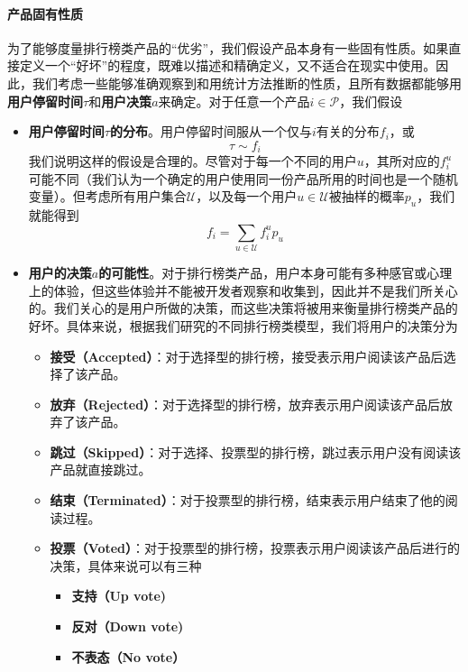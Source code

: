 \documentclass[UTF8]{ctexart}
\theoremstyle{plain}
\theoremstyle{definition}
\theoremstyle{remark}
\begin{document}
	\paragraph{产品固有性质} 为了能够度量排行榜类产品的“优劣”，我们假设产品本身有一些固有性质。如果直接定义一个“好坏”的程度，既难以描述和精确定义，又不适合在现实中使用。因此，我们考虑一些能够准确观察到和用统计方法推断的性质，且所有数据都能够用\textbf{用户停留时间}$\tau$和\textbf{用户决策}$a$来确定。对于任意一个产品$i \in \mathcal{P}$，我们假设
	\begin{itemize}
		\item \textbf{用户停留时间$\tau$的分布}。用户停留时间服从一个仅与$i$有关的分布$f_i$，或
		$$
		\tau \sim f_i
		$$
		我们说明这样的假设是合理的。尽管对于每一个不同的用户$u$，其所对应的$f_i^u$可能不同（我们认为一个确定的用户使用同一份产品所用的时间也是一个随机变量）。但考虑所有用户集合$\mathcal{U}$，以及每一个用户$u \in \mathcal{U}$被抽样的概率$p_u$，我们就能得到
		$$
		f_i = \sum_{u \in \mathcal{U}} f_i^u p_u 
		$$
		\item \textbf{用户的决策$a$的可能性}。对于排行榜类产品，用户本身可能有多种感官或心理上的体验，但这些体验并不能被开发者观察和收集到，因此并不是我们所关心的。我们关心的是用户所做的决策，而这些决策将被用来衡量排行榜类产品的好坏。具体来说，根据我们研究的不同排行榜类模型，我们将用户的决策分为
		\begin{itemize}
			\item \textbf{接受（Accepted）}：对于选择型的排行榜，接受表示用户阅读该产品后选择了该产品。
			\item \textbf{放弃（Rejected）}：对于选择型的排行榜，放弃表示用户阅读该产品后放弃了该产品。
			\item \textbf{跳过（Skipped）}：对于选择、投票型的排行榜，跳过表示用户没有阅读该产品就直接跳过。
			\item \textbf{结束（Terminated）}：对于投票型的排行榜，结束表示用户结束了他的阅读过程。
			\item \textbf{投票（Voted）}：对于投票型的排行榜，投票表示用户阅读该产品后进行的决策，具体来说可以有三种
			\begin{itemize}
				\item \textbf{支持（Up vote)}
				\item \textbf{反对（Down vote)}
				\item \textbf{不表态（No vote）}
			\end{itemize}
		\end{itemize}
	\end{itemize}
\end{document}
